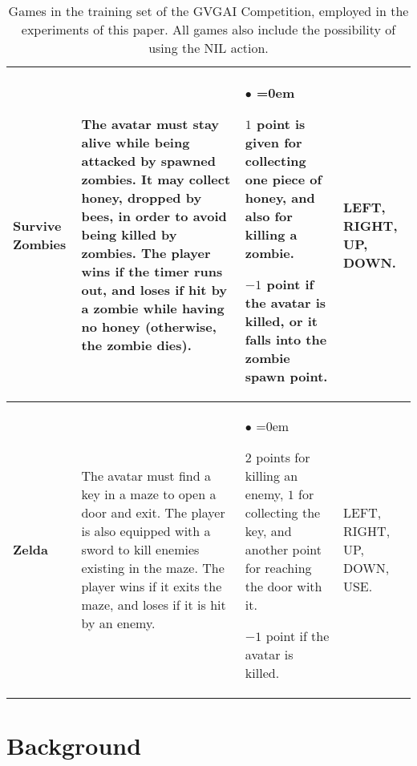 \documentclass[conference]{IEEEtran}
\begin{document}
\begin{table*}[!t]
\begin{center}
\begin{tabular}{|m{1.4cm}|m{8cm}|m{5cm}|m{1cm}|}
\hline
\textbf{Survive Zombies} & The avatar must stay alive while being attacked by spawned zombies. It may collect honey, dropped by bees, in order to avoid being killed by zombies. The player wins if the timer runs out, and loses if hit by a zombie while having no honey (otherwise, the zombie dies).& \begin{list}{$\bullet$}{\leftmargin=2pt \itemindent=0em} \item $1$ point is given for collecting one piece of honey, and also for killing a zombie. \item $-1$ point if the avatar is killed, or it falls into the zombie spawn point. \end{list} & LEFT, RIGHT, UP, DOWN.\\
\hline
\textbf{Zelda} & The avatar must find a key in a maze to open a door and exit. The player is also equipped with a sword to kill enemies existing in the maze. The player wins if it exits the maze, and loses if it is hit by an enemy. & \begin{list}{$\bullet$}{\leftmargin=2pt \itemindent=0em} \item $2$ points for killing an enemy, $1$ for collecting the key, and another point for reaching the door with it. \item $-1$ point if the avatar is killed. \end{list} & LEFT, RIGHT, UP, DOWN, USE. \\
\hline
\end{tabular}
\caption{Games in the training set of the GVGAI Competition, employed in the experiments of this paper. All games also include the possibility of using the NIL action.}
\label{tab:games}
\end{center}
\end{table*}






\section{Background} \label{sec:fastEvo}
\end{document}
